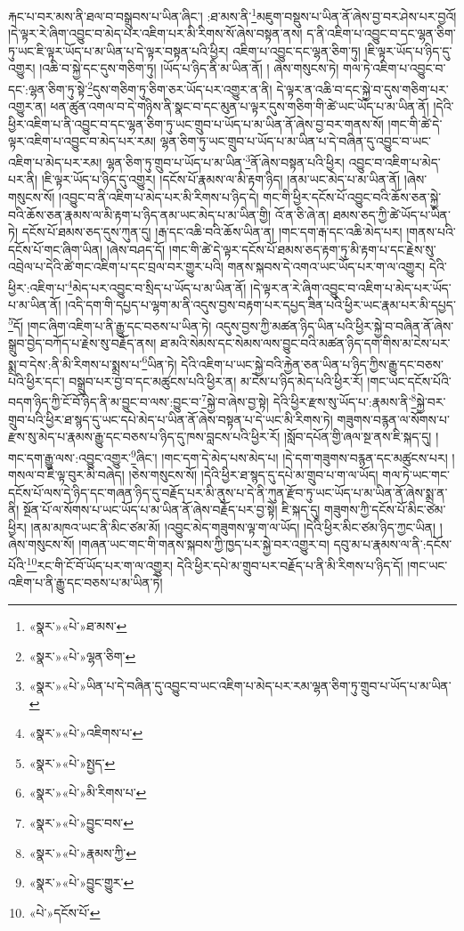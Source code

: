 རྐང་པ་བར་མས་ནི་ཐལ་བ་བསྒྲུབས་པ་ཡིན་ཞིང་། :ཐ་མས་ནི་\footnote{«སྣར་»«པེ་»ཐ་མས་}མཇུག་བསྡུས་པ་ཡིན་ནོ་ཞེས་བྱ་བར་ཤེས་པར་བྱའོ། །དེ་ལྟར་རེ་ཞིག་འབྱུང་བ་མེད་པར་འཇིག་པར་མི་རིགས་སོ་ཞེས་བསྟན་ནས། ད་ནི་འཇིག་པ་འབྱུང་བ་དང་ལྷན་ཅིག་ཏུ་ཡང་ཇི་ལྟར་ཡོད་པ་མ་ཡིན་པ་དེ་ལྟར་བསྟན་པའི་ཕྱིར། འཇིག་པ་འབྱུང་དང་ལྷན་ཅིག་ཏུ། །ཇི་ལྟར་ཡོད་པ་ཉིད་དུ་འགྱུར། །འཆི་བ་སྐྱེ་དང་དུས་གཅིག་ཏུ། །ཡོད་པ་ཉིད་ནི་མ་ཡིན་ནོ། །
ཞེས་གསུངས་ཏེ། གལ་ཏེ་འཇིག་པ་འབྱུང་བ་དང་:ལྷན་ཅིག་ཏུ་སྟེ་\footnote{«སྣར་»«པེ་»ལྷན་ཅིག་}དུས་གཅིག་ཏུ་ཅིག་ཅར་ཡོད་པར་འགྱུར་ན་ནི། དེ་ལྟར་ན་འཆི་བ་དང་སྐྱེ་བ་དུས་གཅིག་པར་འགྱུར་ན། ཕན་ཚུན་འགལ་བ་དེ་གཉིས་ནི་སྣང་བ་དང་མུན་པ་ལྟར་དུས་གཅིག་གི་ཚེ་ཡང་ཡོད་པ་མ་ཡིན་ནོ། །དེའི་ཕྱིར་འཇིག་པ་ནི་འབྱུང་བ་དང་ལྷན་ཅིག་ཏུ་ཡང་གྲུབ་པ་ཡོད་པ་མ་ཡིན་ནོ་ཞེས་བྱ་བར་གནས་སོ། །གང་གི་ཚེ་དེ་ལྟར་འཇིག་པ་འབྱུང་བ་མེད་པར་རམ། ལྷན་ཅིག་ཏུ་ཡང་གྲུབ་པ་ཡོད་པ་མ་ཡིན་པ་དེ་བཞིན་དུ་འབྱུང་བ་ཡང་འཇིག་པ་མེད་པར་རམ། ལྷན་ཅིག་ཏུ་གྲུབ་པ་ཡོད་པ་མ་ཡིན་\footnote{«སྣར་»«པེ་»ཡིན་པ་དེ་བཞིན་དུ་འབྱུང་བ་ཡང་འཇིག་པ་མེད་པར་རམ་ལྷན་ཅིག་ཏུ་གྲུབ་པ་ཡོད་པ་མ་ཡིན་}ནོ་ཞེས་བསྟན་པའི་ཕྱིར། འབྱུང་བ་འཇིག་པ་མེད་པར་ནི། །ཇི་ལྟར་ཡོད་པ་ཉིད་དུ་འགྱུར། །དངོས་པོ་རྣམས་ལ་མི་རྟག་ཉིད། །ནམ་ཡང་མེད་པ་མ་ཡིན་ནོ། །ཞེས་གསུངས་སོ། །འབྱུང་བ་ནི་འཇིག་པ་མེད་པར་མི་རིགས་པ་ཉིད་དེ། གང་གི་ཕྱིར་དངོས་པོ་འབྱུང་བའི་ཆོས་ཅན་སྐྱེ་བའི་ཆོས་ཅན་རྣམས་ལ་མི་རྟག་པ་ཉིད་ནམ་ཡང་མེད་པ་མ་ཡིན་གྱི། འོ་ན་ཅི་ཞེ་ན། ཐམས་ཅད་ཀྱི་ཚེ་ཡོད་པ་ཡིན་ཏེ། དངོས་པོ་ཐམས་ཅད་དུས་ཀུན་དུ། །རྒ་དང་འཆི་བའི་ཆོས་ཡིན་ན། །གང་དག་རྒ་དང་འཆི་མེད་པར། །གནས་པའི་དངོས་པོ་གང་ཞིག་ཡིན། །ཞེས་བཤད་དོ། །གང་གི་ཚེ་དེ་ལྟར་དངོས་པོ་ཐམས་ཅད་རྟག་ཏུ་མི་རྟག་པ་དང་རྗེས་སུ་འབྲེལ་པ་དེའི་ཚེ་གང་འཇིག་པ་དང་བྲལ་བར་གྱུར་པའི། གནས་སྐབས་དེ་འགའ་ཡང་ཡོད་པར་ག་ལ་འགྱུར། དེའི་ཕྱིར་:འཇིག་པ་\footnote{«སྣར་»«པེ་»འཇིགས་པ་}མེད་པར་འབྱུང་བ་སྲིད་པ་ཡོད་པ་མ་ཡིན་ནོ། །དེ་ལྟར་ན་རེ་ཞིག་འབྱུང་བ་འཇིག་པ་མེད་པར་ཡོད་པ་མ་ཡིན་ནོ། །འདི་དག་གི་དཔྱད་པ་ལྷག་མ་ནི་འདུས་བྱས་བརྟག་པར་དཔྱད་ཟིན་པའི་ཕྱིར་ཡང་རྣམ་པར་མི་དཔྱད་\footnote{«སྣར་»«པེ་»སྤྱད་}དོ། །གང་ཞིག་འཇིག་པ་ནི་རྒྱུ་དང་བཅས་པ་ཡིན་ཏེ། འདུས་བྱས་ཀྱི་མཚན་ཉིད་ཡིན་པའི་ཕྱིར་སྐྱེ་བ་བཞིན་ནོ་ཞེས་སྒྲུབ་བྱེད་བཀོད་པ་རྗེས་སུ་བརྗོད་ནས། ཐ་མའི་སེམས་དང་སེམས་ལས་བྱུང་བའི་མཚན་ཉིད་དག་གིས་མ་ངེས་པར་སྨྲ་བ་དེས་:ནི་མི་རིགས་པ་སྨྲས་པ་\footnote{«སྣར་»«པེ་»མི་རིགས་པ་}ཡིན་ཏེ། དེའི་འཇིག་པ་ཡང་སྐྱེ་བའི་རྐྱེན་ཅན་ཡིན་པ་ཉིད་ཀྱིས་རྒྱུ་དང་བཅས་པའི་ཕྱིར་དང་། བསྒྲུབ་པར་བྱ་བ་དང་མཚུངས་པའི་ཕྱིར་ན། མ་ངེས་པ་ཉིད་མེད་པའི་ཕྱིར་རོ། །གང་ཡང་དངོས་པོའི་བདག་ཉིད་ཀྱི་ངོ་བོ་ཉིད་ནི་མ་བྱུང་བ་ལས་:བྱུང་བ་\footnote{«སྣར་»«པེ་»བྱུང་བས་}སྐྱེ་བ་ཞེས་བྱ་སྟེ། དེའི་ཕྱིར་རྫས་སུ་ཡོད་པ་:རྣམས་ནི་\footnote{«སྣར་»«པེ་»རྣམས་ཀྱི་}སྐྱེ་བར་གྲུབ་པའི་ཕྱིར་ཐ་སྙད་དུ་ཡང་དཔེ་མེད་པ་ཡིན་ནོ་ཞེས་བསྟན་པ་དེ་ཡང་མི་རིགས་ཏེ། གཟུགས་བརྙན་ལ་སོགས་པ་རྫས་སུ་མེད་པ་རྣམས་རྒྱུ་དང་བཅས་པ་ཉིད་དུ་ཁས་བླངས་པའི་ཕྱིར་རོ། །སློབ་དཔོན་གྱི་ཞལ་སྔ་ནས་ཇི་སྐད་དུ། །གང་དག་རྒྱུ་ལས་:འབྱུང་འགྱུར་\footnote{«སྣར་»«པེ་»བྱུང་གྱུར་}ཞིང་། །གང་དག་དེ་མེད་པས་མེད་པ། །དེ་དག་གཟུགས་བརྙན་དང་མཚུངས་པར། །གསལ་བ་ཇི་ལྟ་བུར་མི་བཞེད། །ཅེས་གསུངས་སོ། །དེའི་ཕྱིར་ཐ་སྙད་དུ་དཔེ་མ་གྲུབ་པ་ག་ལ་ཡོད། གལ་ཏེ་ཡང་གང་དངོས་པོ་ལས་དེ་ཉིད་དང་གཞན་ཉིད་དུ་བརྗོད་པར་མི་ནུས་པ་དེ་ནི་ཀུན་རྫོབ་ཏུ་ཡང་ཡོད་པ་མ་ཡིན་ནོ་ཞེས་སྨྲ་ན་ནི། སྔོན་པོ་ལ་སོགས་པ་ཡང་ཡོད་པ་མ་ཡིན་ནོ་ཞེས་བརྗོད་པར་བྱ་སྟེ། ཇི་སྐད་དུ། གཟུགས་ཀྱི་དངོས་པོ་མིང་ཙམ་ཕྱིར། །ནམ་མཁའ་ཡང་ནི་མིང་ཙམ་མོ། །འབྱུང་མེད་གཟུགས་ལྟ་ག་ལ་ཡོད། །དེའི་ཕྱིར་མིང་ཙམ་ཉིད་ཀྱང་ཡིན། །ཞེས་གསུངས་སོ། །གཞན་ཡང་གང་གི་གནས་སྐབས་ཀྱི་ཁྱད་པར་སྐྱེ་བར་འགྱུར་བ། དབུ་མ་པ་རྣམས་ལ་ནི་:དངོས་པོའི་\footnote{«པེ་»དངོས་པོ་}རང་གི་ངོ་བོ་ཡོད་པར་ག་ལ་འགྱུར། དེའི་ཕྱིར་དཔེ་མ་གྲུབ་པར་བརྗོད་པ་ནི་མི་རིགས་པ་ཉིད་དོ། །གང་ཡང་འཇིག་པ་ནི་རྒྱུ་དང་བཅས་པ་མ་ཡིན་ཏེ། 